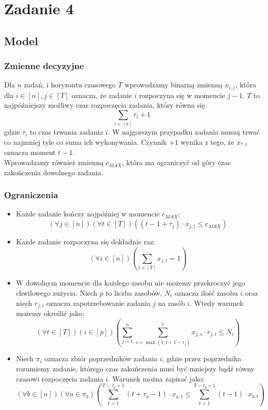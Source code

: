\documentclass{article}
\begin{document}
\section{Zadanie 4}
\subsection{Model}
\subsubsection{Zmienne decyzyjne}
Dla $n$ zadań, i horyzontu czasowego $T$ wprowadzamy binarną zmienną $x_{i,j}$, która dla $i\in[n],j\in[T]$ oznacza, że zadanie $i$ rozpoczyna się w momencie $j-1$. $T$ to najpóźniejszy możliwy czas rozpoczęcia zadania, który równa się
$$\sum_{i\in [n]} \tau_i + 1$$ 
gdzie $\tau_i$ to czas trwania zadania $i$. W najgorszym przypadku zadania muszą trwać co najmniej tyle co suma ich wykonywania. Czynnik $+1$ wynika z tego, że $x_{*,t}$ oznacza moment $t-1$.\\
Wprowadzamy również zmienną $c_{MAX}$, która ma ograniczyć od góry czas zakończenia dowolnego zadania.

\subsubsection{Ograniczenia}

\begin{itemize}
\item Każde zadanie kończy najpóźniej w momencie $c_{MAX}$:
$$(\forall j \in [n])(\forall t \in [T])\left((t-1+\tau_j)\cdot x_{j,t} \leq c_{MAX }\right)$$
\item Każde zadanie rozpoczyna się dokładnie raz:
$$(\forall i \in [n])\left(\sum_{t\in [T]}x_{j,t}=1\right)$$
\item W dowolnym momencie dla każdego zasobu nie możemy przekroczyć jego chwilowego zużycia.  Niech $p$ to liczba zasobów, $N_i$ oznacza ilość zasobu $i$ oraz niech $r_{j,i}$ oznacza zapotrzebowanie zadania $j$ na zasób $i$. Wtedy warunek możemy określić jako:
$$(\forall t\in[T])(i \in [p])\left( \sum_{j=1}^n  \sum_{s=\max(1,t+1-\tau_j)}^t x_{j,s}\cdot r_{j,i} \leq N_i \right)$$
\item Niech $\pi_i$ oznacza zbiór poprzedników zadania $i$, gdzie przez poprzednika rozumiemy zadanie, którego czas zakończenia musi być mniejszy bądź równy czasowi rozpoczęcia zadania $i$. Warunek można zapisać jako:
$$(\forall b \in [n])(\forall a \in \pi_b)\left( \sum_{t=1}^{T-\tau_a+1} (t+\tau_a-1) \cdot x_{a,t}  \leq \sum_{t=1}^{T-\tau_b+1} (t-1) \cdot x_{b,t}  \right)$$
\end{itemize}
\end{document}
